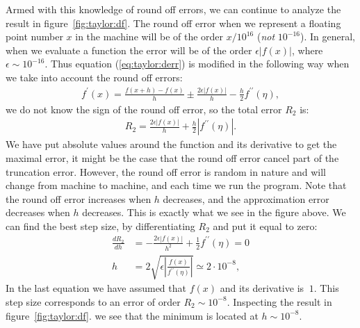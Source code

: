 \documentclass[graybox,sectrefs,envcountresetchap,open=right,final]{svmonodo}
\begin{document}
Armed with this knowledge of round off errors, we can continue to analyze
the result in figure~\ref{fig:taylor:df}.
The round off error when we represent a floating point number $x$ in the 
machine will be of the order $x/10^{16}$ (\emph{not} $10^{-16}$). In general, when we evaluate a function the error will be of the order 
$\epsilon|f(x)|$, where $\epsilon\sim10^{-16}$. Thus equation (\ref{eq:taylor:derr}) is modified in the following way when we take into account the round off errors:
\begin{align}
f^\prime(x)=\frac{f(x+h)-f(x)}{h}\pm\frac{2\epsilon|f(x)|}{h}-\frac{h}{2}f^{\prime\prime}(\eta),\label{eq:taylor:derr2}
\end{align}
we do not know the sign of the round off error, so the total error $R_2$ is:
\begin{align}
R_2=\frac{2\epsilon|f(x)|}{h}+\frac{h}{2}|f^{\prime\prime}(\eta)|.\label{eq:taylor:derr3}
\end{align}
We have put absolute values around the function and its derivative to get the maximal error, it might be the case that the round off error cancel part of the 
truncation error. However, the round off error is random in nature and will change from machine to machine, and each time we run the program. 
Note that the round off error increases when $h$ decreases, and the approximation error decreases when $h$ decreases. This is exactly what we see in the figure above. We can find the 
best step size, by differentiating $R_2$ and put it equal to zero:
\begin{align}
\frac{dR_2}{dh}&=-\frac{2\epsilon|f(x)|}{h^2}+\frac{1}{2}f^{\prime\prime}(\eta)=0\nonumber\\ 
h&=2\sqrt{\epsilon\left|\frac{f(x)}{f^{\prime\prime}(\eta)}\right|}\simeq 2\cdot10^{-8},\label{eq:taylor:derr4}
\end{align}
In the last equation we have assumed that $f(x)$ and its derivative is $~1$. This step size corresponds to an error of order $R_2\sim10^{-8}$. 
Inspecting 
the result in figure~\ref{fig:taylor:df}.
we see that the minimum is located at $h\sim10^{-8}$.      
\end{document}
